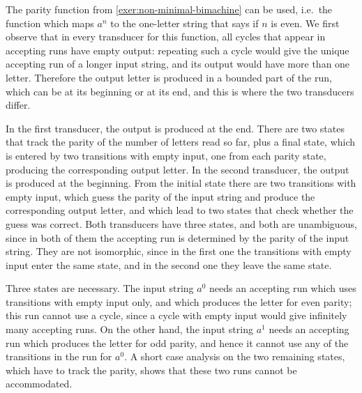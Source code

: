 {The parity function from \cref{exer:non-minimal-bimachine} can be used, i.e.~the function which maps $a^n$ to the one-letter string that says if $n$ is even. We first observe that in every transducer for this function, all cycles that appear in accepting runs have empty output: repeating such a cycle would give the unique accepting run of a longer input string, and its output would have more than one letter. Therefore the output letter is produced in a bounded part of the run, which can be at its beginning or at its end, and this is where the two transducers differ.

    In the first transducer, the output is produced at the end. There are two states that track the parity of the number of letters read so far, plus a final state, which is entered by two transitions with empty input, one from each parity state, producing the corresponding output letter. In the second transducer, the output is produced at the beginning. From the initial state there are two transitions with empty input, which guess the parity of the input string and produce the corresponding output letter, and which lead to two states that check whether the guess was correct. Both transducers have three states, and both are unambiguous, since in both of them the accepting run is determined by the parity of the input string. They are not isomorphic, since in the first one the transitions with empty input enter the same state, and in the second one they leave the same state.

    Three states are necessary. The input string $a^0$ needs an accepting run which uses transitions with empty input only, and which produces the letter for even parity; this run cannot use a cycle, since a cycle with empty input would give infinitely many accepting runs. On the other hand, the input string $a^1$ needs an accepting run which produces the letter for odd parity, and hence it cannot use any of the transitions in the run for $a^0$. A short case analysis on the two remaining states, which have to track the parity, shows that these two runs cannot be accommodated.
}
